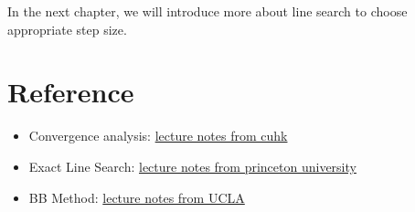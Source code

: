 In the next chapter, we will introduce more about line search to choose appropriate step size. 

\section{Reference}
\begin{itemize}
    \item Convergence analysis: \href{https://www.math.cuhk.edu.hk/course_builder/1617/math6211a/cvxop.pdf}{lecture notes from cuhk}
    \item Exact Line Search: \href{https://www.princeton.edu/~aaa/Public/Teaching/ORF363_COS323/F23/ORF363_COS323_F23_Lec8.pdf}{lecture notes from princeton university}
    \item BB Method: \href{https://www.cmor-faculty.rice.edu/~yzhang/caam565/L1_reg/BB-step.pdf}{lecture notes from UCLA}
\end{itemize}